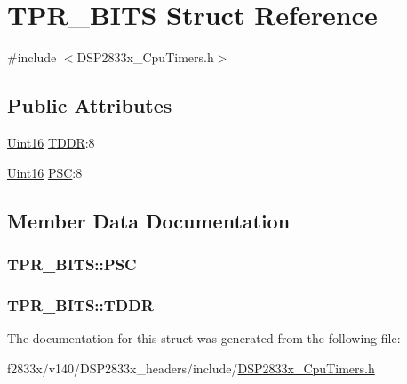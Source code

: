 \hypertarget{struct_t_p_r___b_i_t_s}{}\section{T\+P\+R\+\_\+\+B\+I\+T\+S Struct Reference}
\label{struct_t_p_r___b_i_t_s}


{\ttfamily \#include $<$D\+S\+P2833x\+\_\+\+Cpu\+Timers.\+h$>$}

\subsection*{Public Attributes}
\begin{DoxyCompactItemize}
\item 
\hyperlink{_d_s_p2833x___device_8h_a59a9f6be4562c327cbfb4f7e8e18f08b}{Uint16} \hyperlink{struct_t_p_r___b_i_t_s_a30327fc4a4013caa6c6a3ff5c3194e34}{T\+D\+D\+R}\+:8
\item 
\hyperlink{_d_s_p2833x___device_8h_a59a9f6be4562c327cbfb4f7e8e18f08b}{Uint16} \hyperlink{struct_t_p_r___b_i_t_s_aa35ab7a27482dbbcaa7881ce3fcf4a3d}{P\+S\+C}\+:8
\end{DoxyCompactItemize}


\subsection{Member Data Documentation}
\hypertarget{struct_t_p_r___b_i_t_s_aa35ab7a27482dbbcaa7881ce3fcf4a3d}{}
\subsubsection[{P\+S\+C}]{ T\+P\+R\+\_\+\+B\+I\+T\+S\+::\+P\+S\+C}\label{struct_t_p_r___b_i_t_s_aa35ab7a27482dbbcaa7881ce3fcf4a3d}
\hypertarget{struct_t_p_r___b_i_t_s_a30327fc4a4013caa6c6a3ff5c3194e34}{}
\subsubsection[{T\+D\+D\+R}]{ T\+P\+R\+\_\+\+B\+I\+T\+S\+::\+T\+D\+D\+R}\label{struct_t_p_r___b_i_t_s_a30327fc4a4013caa6c6a3ff5c3194e34}


The documentation for this struct was generated from the following file\+:\begin{DoxyCompactItemize}
\item 
f2833x/v140/\+D\+S\+P2833x\+\_\+headers/include/\hyperlink{_d_s_p2833x___cpu_timers_8h}{D\+S\+P2833x\+\_\+\+Cpu\+Timers.\+h}\end{DoxyCompactItemize}
